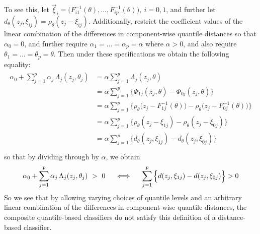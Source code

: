
To see this, let
$\vec{\xi}_i = \Big(F_{i1}^{-1}(\theta), \dots, F_{ip}^{-1}(\theta) \Big),~ i =
0, 1$, and further let
$d_\theta(z_j, \xi_{ij}) = \rho_{\theta}(z_j - \xi_{ij})$.  Additionally,
restrict the coefficient values of the linear combination of the differences in
component-wise quantile distances so that $\alpha_0 = 0$, and further require
$\alpha_1 = \dots = \alpha_p = \alpha$ where $\alpha > 0$, and also require
$\theta_1 = \dots = \theta_p = \theta$.  Then under these specifications we
obtain the following equality:
\begin{align}
  \label{eq:composite-is-distance}
  \begin{split}
  \alpha_0 + \sum_{j=1}^p \alpha_j \, \Lambda_j (z_j, \theta_j)
  &= \alpha \sum_{j=1}^p \Lambda_j (z_j, \theta) \\[1ex]
  &= \alpha \sum_{j=1}^p \Big\{
  \Phi_{1j} (z_j, \theta) - \Phi_{0j} (z_j, \theta)
  \Big\} \\[1ex]
  &= \alpha \sum_{j=1}^p \Big\{
  \rho_{\theta} \Big(z_j - F_{1j}^{-1}(\theta) \Big) -
  \rho_{\theta} \Big(z_j - F_{0j}^{-1}(\theta) \Big)
  \Big\} \\[1ex]
  &= \alpha \sum_{j=1}^p \Big\{
  \rho_{\theta} (z_j - \xi_{1j} ) -
  \rho_{\theta} (z_j - \xi_{0j} )
  \Big\} \\[1ex]
  &= \alpha \sum_{j=1}^p \Big\{
  d_\theta(z_j, \xi_{1j}) -
  d_\theta(z_j, \xi_{0j})
  \Big\} \\[1ex]
  \end{split}
\end{align}
so that by dividing through by $\alpha$, we obtain
\begin{equation}
  \label{eq:boundary-equivalence}
  \alpha_0 + \sum_{j=1}^p \alpha_j \, \Lambda_j (z_j, \theta_j) ~>~ 0
  \hspace{5mm} \Longleftrightarrow \hspace{5mm}
  \sum_{j=1}^p \Big\{ d(z_j, \xi_{1j}) - d(z_j, \xi_{0j}) \Big\} > 0
\end{equation}
So we see that by allowing varying choices of quantile levels and an arbitrary
linear combination of the differences in component-wise quantile distances, the
composite quantile-based classifiers do not satisfy this definition of a
distance-based classifier.




